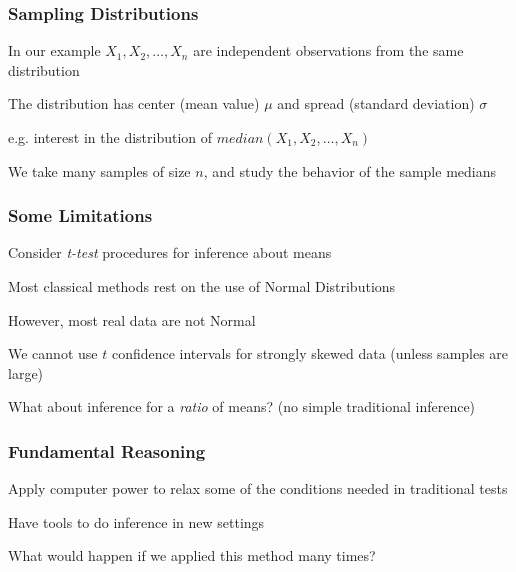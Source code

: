 \documentclass[12pt]{beamer}\usepackage[]{graphicx}\usepackage[]{color}
\begin{document}

\begin{frame}
\frametitle{Sampling Distributions}

\bbi
  \item In our example $X_1, X_2, \dots, X_n$ are independent observations from the same distribution
  \item The distribution has center (mean value) $\mu$ and spread (standard deviation) $\sigma$
  \item e.g. interest in the distribution of $median(X_1, X_2, \dots, X_n)$
  \item We take many samples of size $n$, and study the behavior of the sample medians
\ei

\end{frame}


\begin{frame}
\frametitle{Some Limitations}

\bi
  \item Consider \textit{t-test} procedures for inference about means
  \item Most classical methods rest on the use of Normal Distributions
  \item However, most real data are not Normal
  \item We cannot use $t$ confidence intervals for strongly skewed data (unless samples are large)
  \item What about inference for a \textit{ratio} of means? (no simple traditional inference)
\ei

\end{frame}


\begin{frame}
\frametitle{Fundamental Reasoning}

\bi
  \item Apply computer power to relax some of the conditions needed in traditional tests
  \item Have tools to do inference in new settings
  \item What would happen if we applied this method many times?
\ei

\end{frame}

\end{document}
